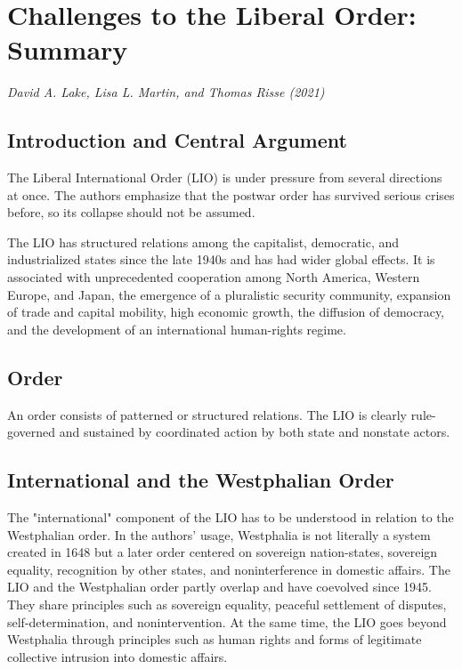 
\section{Challenges to the Liberal Order: Summary}
\begin{center}
\textit{David A. Lake, Lisa L. Martin, and Thomas Risse (2021)}
\end{center}

\subsection{Introduction and Central Argument}

The Liberal International Order (LIO) is under pressure from several directions at once. The authors emphasize that the postwar order has survived serious crises before, so its collapse should not be assumed.

The LIO has structured relations among the capitalist, democratic, and industrialized states since the late 1940s and has had wider global effects. It is associated with unprecedented cooperation among North America, Western Europe, and Japan, the emergence of a pluralistic security community, expansion of trade and capital mobility, high economic growth, the diffusion of democracy, and the development of an international human-rights regime.

\subsection{Order}

An order consists of patterned or structured relations. The LIO is clearly rule-governed and sustained by coordinated action by both state and nonstate actors.

\subsection{International and the Westphalian Order}

The "international" component of the LIO has to be understood in relation to the Westphalian order. In the authors' usage, Westphalia is not literally a system created in 1648 but a later order centered on sovereign nation-states, sovereign equality, recognition by other states, and noninterference in domestic affairs. The LIO and the Westphalian order partly overlap and have coevolved since 1945. They share principles such as sovereign equality, peaceful settlement of disputes, self-determination, and nonintervention. At the same time, the LIO goes beyond Westphalia through principles such as human rights and forms of legitimate collective intrusion into domestic affairs.

